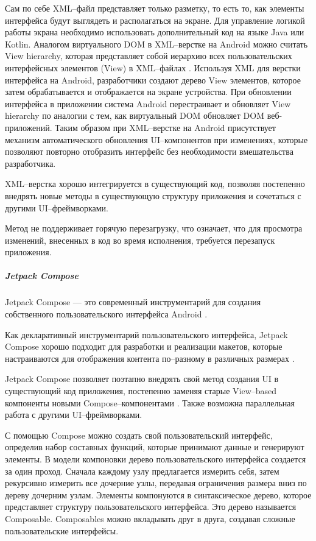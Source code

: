 Сам по себе XML--файл представляет только разметку, то есть то, как элементы интерфейса будут выглядеть и располагаться на экране. 
Для управление логикой работы экрана необходимо использовать дополнительный код на языке Java или Kotlin.
Аналогом виртуального DOM в XML--верстке на Android можно считать View hierarchy, которая представляет собой иерархию всех пользовательских интерфейсных элементов (View) в XML--файлах \cite{dom-android}. 
Используя XML для верстки интерфейса на Android, разработчики создают дерево View элементов, которое затем обрабатывается и отображается на экране устройства. 
При обновлении интерфейса в приложении система Android перестраивает и обновляет View hierarchy по аналогии с тем, как виртуальный DOM обновляет DOM веб-приложений. 
Таким образом при XML--верстке на Android присутствует механизм автоматического обновления UI--компонентов при изменениях, которые позволяют повторно отобразить интерфейс без необходимости вмешательства разработчика.

XML--верстка хорошо интегрируется в существующий код, позволяя постепенно внедрять новые методы в существующую структуру приложения и сочетаться с другими UI--фреймворками.

Метод не поддерживает горячую перезагрузку, что означает, что для просмотра изменений, внесенных в код во время исполнения, требуется перезапуск приложения.

\subparagraph{Jetpack Compose} 
\subparagraph{}  
Jetpack Compose --- это современный инструментарий для создания собственного пользовательского интерфейса Android \cite{jetpack}.

Как декларативный инструментарий пользовательского интерфейса, Jetpack Compose хорошо подходит для разработки и реализации макетов, которые настраиваются для отображения контента по--разному в различных размерах \cite{jetpack-layout}.

Jetpack Compose позволяет поэтапно внедрять свой метод создания UI в существующий код приложения, постепенно заменяя старые View--based компоненты новыми Compose--компонентами \cite{jetpack-layout}. 
Также возможна параллельная работа с другими UI--фреймворками.

С помощью Compose можно создать свой пользовательский интерфейс, определив набор составных функций, которые принимают данные и генерируют элементы. 
В модели компоновки дерево пользовательского интерфейса создается за один проход. 
Сначала каждому узлу предлагается измерить себя, затем рекурсивно измерить все дочерние узлы, передавая ограничения размера вниз по дереву дочерним узлам. 
Элементы компонуются в синтаксическое дерево, которое представляет структуру пользовательского интерфейса. 
Это дерево называется Composable.
Composables можно вкладывать друг в друга, создавая сложные пользовательские интерфейсы.

